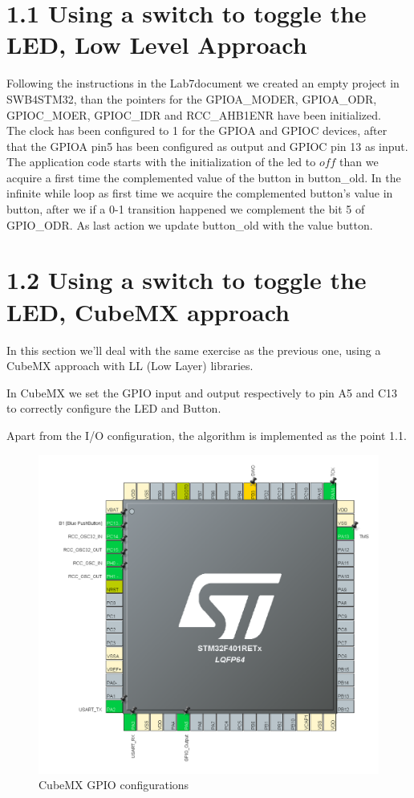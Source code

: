 \documentclass[12pt]{article}
\begin{document}
\section*{1.1 Using a switch to toggle the LED, Low Level Approach}
Following the instructions in the Lab7document we created an empty project in SWB4STM32, than the pointers for the GPIOA\_MODER, GPIOA\_ODR, GPIOC\_MOER, GPIOC\_IDR and RCC\_AHB1ENR have been initialized. \\
The clock has been configured to 1 for the GPIOA and GPIOC devices, after that the GPIOA pin5 has been configured as output and GPIOC pin 13 as input.\\
The application code starts with the initialization of the led to $off$ than we acquire a first time the complemented value of the button in button\_old. In the infinite while loop as first time we acquire the complemented button's value in button, after we if a 0-1 transition happened we complement the bit 5 of GPIO\_ODR. As last action we update button\_old with the value button.


\section*{1.2 Using a switch to toggle the LED, CubeMX approach}
In this section we'll deal with the same exercise as the previous one, using a CubeMX approach with LL (Low Layer) libraries. 

In CubeMX we set the GPIO input and output respectively to pin A5 and C13 to correctly configure the LED and Button.

Apart from the I/O configuration, the algorithm is implemented as the point 1.1.

	\begin{figure}[!h]
		\centering
		\includegraphics[scale = 0.7]{immagini/1_2.png}
		\caption{CubeMX GPIO configurations}
	\end{figure}
\end{document}
